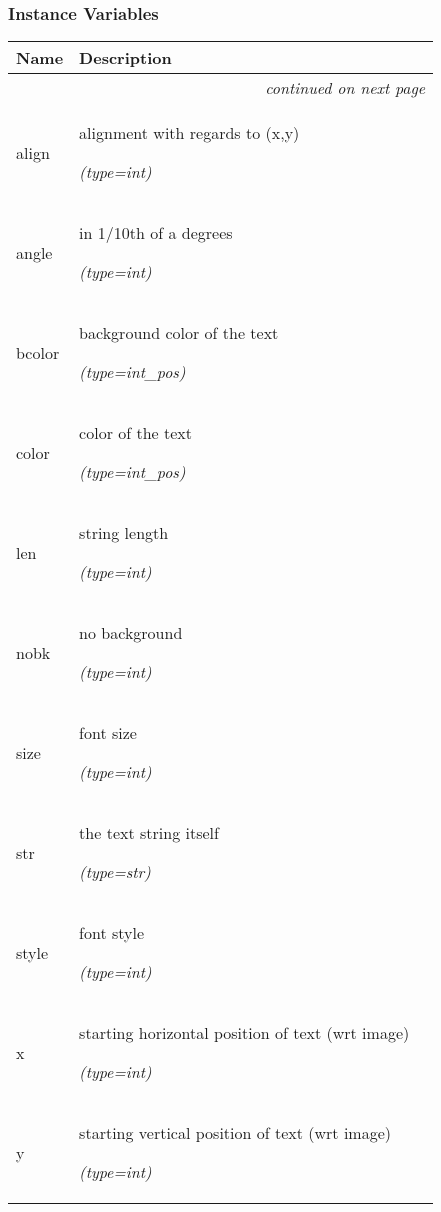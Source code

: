 
  \subsubsection{Instance Variables}

    \vspace{-1cm}
\hspace{\varindent}\begin{longtable}{|p{\varnamewidth}|p{\vardescrwidth}|l}
\cline{1-2}
\cline{1-2} \centering \textbf{Name} & \centering \textbf{Description}& \\
\cline{1-2}
\endhead\cline{1-2}\multicolumn{3}{r}{\small\textit{continued on next page}}\\\endfoot\cline{1-2}
\endlastfoot\raggedright a\-l\-i\-g\-n\- & \raggedright alignment with regards to (x,y)

            {\it (type=int)}&\\
\cline{1-2}
\raggedright a\-n\-g\-l\-e\- & \raggedright in 1/10th of a degrees

            {\it (type=int)}&\\
\cline{1-2}
\raggedright b\-c\-o\-l\-o\-r\- & \raggedright background color of the text

            {\it (type=int\_pos)}&\\
\cline{1-2}
\raggedright c\-o\-l\-o\-r\- & \raggedright color of the text

            {\it (type=int\_pos)}&\\
\cline{1-2}
\raggedright l\-e\-n\- & \raggedright string length

            {\it (type=int)}&\\
\cline{1-2}
\raggedright n\-o\-b\-k\- & \raggedright no background

            {\it (type=int)}&\\
\cline{1-2}
\raggedright s\-i\-z\-e\- & \raggedright font size

            {\it (type=int)}&\\
\cline{1-2}
\raggedright s\-t\-r\- & \raggedright the text string itself

            {\it (type=str)}&\\
\cline{1-2}
\raggedright s\-t\-y\-l\-e\- & \raggedright font style

            {\it (type=int)}&\\
\cline{1-2}
\raggedright x\- & \raggedright starting horizontal position of text (wrt image)

            {\it (type=int)}&\\
\cline{1-2}
\raggedright y\- & \raggedright starting vertical position of text (wrt image)

            {\it (type=int)}&\\
\cline{1-2}
\end{longtable}

